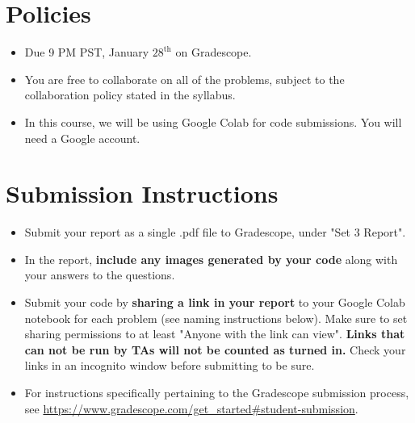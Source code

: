 \newif\ifshowsolutions
\showsolutionstrue







\pagestyle{fancy}




\section*{Policies}
\begin{itemize}
	\item Due 9 PM PST, January $28^\text{th}$ on Gradescope. 
	\item You are free to collaborate on all of the problems, subject to the collaboration policy stated in the syllabus.
	\item In this course, we will be using Google Colab for code submissions. You will need a Google account.
\end{itemize}

\section*{Submission Instructions}
\begin{itemize}
	\item Submit your report as a single .pdf file to Gradescope, under "Set 3 Report". 
	\item In the report, \textbf{include any images generated by your code} along with your answers to the questions.
	\item Submit your code by \textbf{sharing a link in your report} to your Google Colab notebook for each problem (see naming instructions below). Make sure to set sharing permissions to at least "Anyone with the link can view". \textbf{Links that can not be run by TAs will not be counted as turned in.} Check your links in an incognito window before submitting to be sure. 
	\item For instructions specifically pertaining to the Gradescope submission process, see \url{https://www.gradescope.com/get_started#student-submission}.
\end{itemize}

